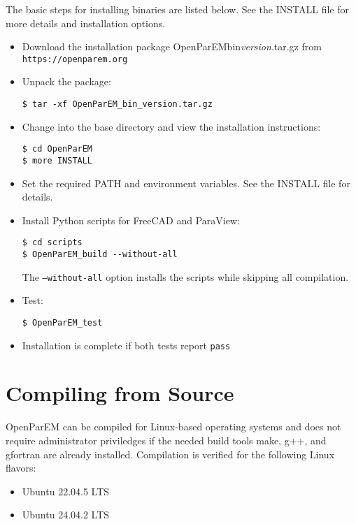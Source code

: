 \documentclass[titlepage]{article}
\renewcommand\_{\textunderscore\linebreak[1]}
\begin{document}
The basic steps for installing binaries are listed below.  See the INSTALL file for more details and installation options.
\begin{itemize}[nosep]
   \item Download the installation package OpenParEM\_bin\_\textit{version}.tar.gz from \verb+https://openparem.org+
   \item Unpack the package:
         \begin{Verbatim}
$ tar -xf OpenParEM_bin_version.tar.gz
         \end{Verbatim}
   \item Change into the base directory and view the installation instructions:
         \begin{Verbatim}
$ cd OpenParEM
$ more INSTALL
         \end{Verbatim}
   \item Set the required PATH and environment variables.  See the INSTALL file for details.
   \item Install Python scripts for FreeCAD and ParaView:
         \begin{Verbatim}
$ cd scripts
$ OpenParEM_build --without-all
         \end{Verbatim}
         The \texttt{--without-all} option installs the scripts while skipping all compilation.
   \item Test:
         \begin{Verbatim}
$ OpenParEM_test
         \end{Verbatim}
   \item Installation is complete if both tests report \texttt{pass}
\end{itemize}

\section{Compiling from Source}

OpenParEM can be compiled for Linux-based operating systems and does not require administrator priviledges if the needed build tools make, g++, and gfortran are already installed. Compilation is verified for the following Linux flavors:
\begin{itemize}[nosep]
   \item Ubuntu 22.04.5 LTS
   \item Ubuntu 24.04.2 LTS
\end{itemize}
\end{document}
